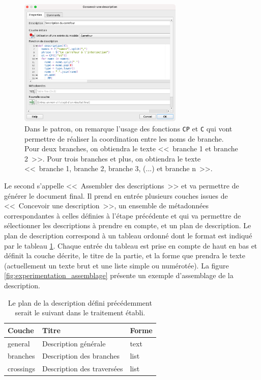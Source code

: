 \begin{figure}[ht]
    \centering
    \includegraphics[width=0.7\textwidth]{images/experimentation/qgis2desc_conception.png}
    \caption[Fenêtre QGIS de conception de description]{Dans le patron, on remarque l'usage des fonctions \texttt{CP} et \texttt{C} qui vont permettre de réaliser la coordination entre les noms de branche. Pour deux branches, on obtiendra le texte <<~branche 1 et branche 2~>>. Pour trois branches et plus, on obtiendra le texte <<~branche 1, branche 2, branche 3, (...) et branche n~>>.}
    \label{fig:experimentation_qgis2desc_conception}
\end{figure}

\newpar{}

Le second s'appelle <<~Assembler des descriptions~>> et va permettre de générer le document final. Il prend en entrée plusieurs couches issues de <<~Concevoir une description~>>, un ensemble de métadonnées correspondantes à celles définies à l'étape précédente et qui va permettre de sélectionner les descriptions à prendre en compte, et un plan de description. Le plan de description correspond à un tableau ordonné dont le format est indiqué par le tableau \ref{experimentation:table_plan_description}. Chaque entrée du tableau est prise en compte de haut en bas et définit la couche décrite, le titre de la partie, et la forme que prendra le texte (actuellement un texte brut et une liste simple ou numérotée). La figure \ref{fig:experimentation_assemblage} présente un exemple d'assemblage de la description.

\begin{table}[ht]
    \begin{center}
    \footnotesize
    \begin{tabular}{ | l | l | l | }
        Couche & Titre & Forme\tabularnewline
        \hline
        general & Description générale & text\\
        branches & Description des branches & list\\
        crossings & Description des traversées & list
    \end{tabular}
    \end{center}
    \caption[Schéma tabulaire du plan de la description]{Le plan de la description défini précédemment serait le suivant dans le traitement établi.}
    \label{experimentation:table_plan_description}
\end{table}

